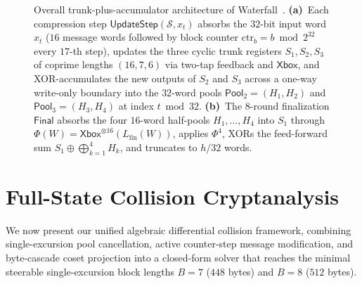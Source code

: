 \documentclass[11pt,a4paper]{article}
\theoremstyle{definition}
\theoremstyle{remark}
\newcommand{\Xbox}{\mathsf{Xbox}}
\newcommand{\UpdateStep}{\mathsf{UpdateStep}}
\newcommand{\Pool}{\mathsf{Pool}}
\begin{document}
\begin{figure}[t!]
\caption{Overall trunk-plus-accumulator architecture of Waterfall~\cite{Hat08}. \textbf{(a)}~Each compression step $\UpdateStep(\mathcal{S}, x_t)$ absorbs the $32$-bit input word $x_t$ ($16$ message words followed by block counter $\mathrm{ctr}_b = b \bmod 2^{32}$ every $17$-th step), updates the three cyclic trunk registers $S_1, S_2, S_3$ of coprime lengths $(16, 7, 6)$ via two-tap feedback and $\Xbox$, and XOR-accumulates the new outputs of $S_2$ and $S_3$ across a one-way write-only boundary into the $32$-word pools $\Pool_2 = (H_1, H_2)$ and $\Pool_3 = (H_3, H_4)$ at index $t \bmod 32$. \textbf{(b)}~The $8$-round finalization $\mathsf{Final}$ absorbs the four $16$-word half-pools $H_1, \dots, H_4$ into $S_1$ through $\Phi(W) = \Xbox^{\otimes 16}(L_{\mathrm{fin}}(W))$, applies $\Phi^4$, XORs the feed-forward sum $S_1 \oplus \bigoplus_{k=1}^4 H_k$, and truncates to $h/32$ words.}
\label{fig:waterfall-arch}
\end{figure}

\section{Full-State Collision Cryptanalysis}
\label{sec:collision}

We now present our unified algebraic differential collision framework, combining single-excursion pool cancellation, active counter-step message modification, and byte-cascade coset projection into a closed-form solver that reaches the minimal steerable single-excursion block lengths $B = 7$ ($448$ bytes) and $B = 8$ ($512$ bytes).
\end{document}
